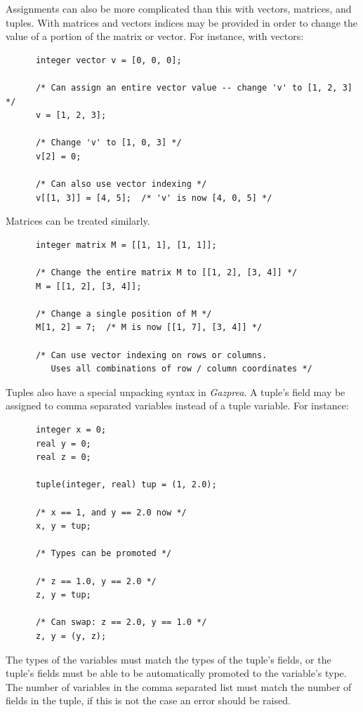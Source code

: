 \documentclass{article}
\begin{document}
    Assignments can also be more complicated than this with vectors, matrices, and tuples. With matrices and vectors
    indices may be provided in order to change the value of a portion of the matrix or vector. For instance, with
    vectors:

    \begin{lstlisting}
      integer vector v = [0, 0, 0];

      /* Can assign an entire vector value -- change 'v' to [1, 2, 3] */
      v = [1, 2, 3];

      /* Change 'v' to [1, 0, 3] */
      v[2] = 0;

      /* Can also use vector indexing */
      v[[1, 3]] = [4, 5];  /* 'v' is now [4, 0, 5] */
    \end{lstlisting}

    Matrices can be treated similarly.

    \begin{lstlisting}
      integer matrix M = [[1, 1], [1, 1]];

      /* Change the entire matrix M to [[1, 2], [3, 4]] */
      M = [[1, 2], [3, 4]];

      /* Change a single position of M */
      M[1, 2] = 7;  /* M is now [[1, 7], [3, 4]] */

      /* Can use vector indexing on rows or columns.
         Uses all combinations of row / column coordinates */
    \end{lstlisting}


    Tuples also have a special unpacking syntax in \textit{Gazprea}. A tuple's field may be assigned to comma
    separated variables instead of a tuple variable. For instance:

    \begin{lstlisting}
      integer x = 0;
      real y = 0;
      real z = 0;

      tuple(integer, real) tup = (1, 2.0);

      /* x == 1, and y == 2.0 now */
      x, y = tup;

      /* Types can be promoted */

      /* z == 1.0, y == 2.0 */
      z, y = tup;

      /* Can swap: z == 2.0, y == 1.0 */
      z, y = (y, z);
    \end{lstlisting}

    The types of the variables must match the types of the tuple's fields, or the tuple's fields must be able to be
    automatically promoted to the variable's type. The number of variables in the comma separated list must match
    the number of fields in the tuple, if this is not the case an error should be raised.
\end{document}
